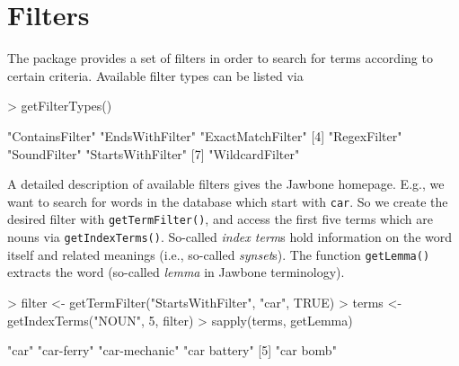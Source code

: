 \documentclass[a4paper]{article}
\newcommand{\code}[1]{\mbox{\texttt{#1}}}
\newcommand{\proglang}[1]{\textsf{#1}}
\begin{document}
\section*{Filters}
The package provides a set of filters in order to search for terms
according to certain criteria. Available filter types can be listed via
\begin{Schunk}
\begin{Sinput}
> getFilterTypes()
\end{Sinput}
\begin{Soutput}
[1] "ContainsFilter"   "EndsWithFilter"   "ExactMatchFilter"
[4] "RegexFilter"      "SoundFilter"      "StartsWithFilter"
[7] "WildcardFilter"  
\end{Soutput}
\end{Schunk}
A detailed description of available
filters gives the \proglang{Jawbone} homepage. E.g., we want to search
for words in the database which start with \code{car}. So we create
the desired filter with \code{getTermFilter()}, and access the first
five terms which are nouns via \code{getIndexTerms()}. So-called \emph{index
term}s hold information on the word itself and related meanings (i.e.,
so-called \emph{synset}s). The function \code{getLemma()} extracts the
word (so-called \emph{lemma} in \proglang{Jawbone} terminology).
\begin{Schunk}
\begin{Sinput}
> filter <- getTermFilter("StartsWithFilter", "car", TRUE)
> terms <- getIndexTerms("NOUN", 5, filter)
> sapply(terms, getLemma)
\end{Sinput}
\begin{Soutput}
[1] "car"          "car-ferry"    "car-mechanic" "car battery" 
[5] "car bomb"    
\end{Soutput}
\end{Schunk}
\end{document}
